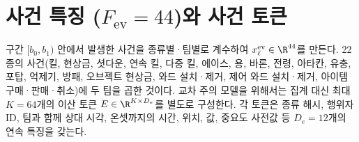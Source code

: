 
\section{사건 특징 ($F_{\mathrm{ev}} = 44$)와 사건 토큰}
\label{sec:feat-event}

구간 $[b_0, b_1)$ 안에서 발생한 사건을 종류별·팀별로 계수하여 $x^{\mathrm{ev}}_\ell \in \R^{44}$를 만든다. 22 종의 사건(킬, 현상금, 셧다운, 연속 킬, 다중 킬, 에이스, 용, 바론, 전령, 아타칸, 유충, 포탑, 억제기, 방패, 오브젝트 현상금, 와드 설치·제거, 제어 와드 설치·제거, 아이템 구매·판매·취소)에 두 팀을 곱한 것이다. 교차 주의 모델을 위해서는 집계 대신 최대 $K = 64$개의 이산 토큰 $E \in \R^{K \times D_e}$를 별도로 구성한다. 각 토큰은 종류 해시, 행위자 ID, 팀과 함께 상대 시각, 온셋까지의 시간, 위치, 값, 중요도 사전값 등 $D_e = 12$개의 연속 특징을 갖는다.
